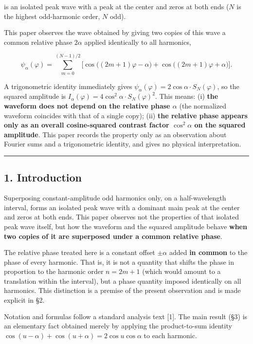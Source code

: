 \documentclass[
]{ltjsarticle}
\begin{document}
is an isolated peak wave with a peak at the center and zeros at both
ends (\(N\) is the highest odd-harmonic order, \(N\) odd).

This paper observes the wave obtained by giving two copies of this wave
a common relative phase \(2\alpha\) applied identically to all
harmonics,

\[
\psi_\alpha(\varphi)=\sum_{m=0}^{(N-1)/2}\Big[\cos\!\big((2m+1)\varphi-\alpha\big)+\cos\!\big((2m+1)\varphi+\alpha\big)\Big].
\]

A trigonometric identity immediately gives
\(\psi_\alpha(\varphi)=2\cos\alpha\cdot S_N(\varphi)\), so the squared
amplitude is \(I_\alpha(\varphi)=4\cos^2\!\alpha\cdot S_N(\varphi)^2\).
This means: (i) \textbf{the waveform does not depend on the relative
phase \(\alpha\)} (the normalized waveform coincides with that of a
single copy); (ii) \textbf{the relative phase appears only as an overall
cosine-squared contrast factor \(\cos^2\!\alpha\) on the squared
amplitude}. This paper records the property only as an observation about
Fourier sums and a trigonometric identity, and gives no physical
interpretation.

\begin{center}\rule{0.5\linewidth}{0.5pt}\end{center}

\subsection{1. Introduction}\label{introduction}

Superposing constant-amplitude odd harmonics only, on a half-wavelength
interval, forms an isolated peak wave with a dominant main peak at the
center and zeros at both ends. This paper observes not the properties of
that isolated peak wave itself, but how the waveform and the squared
amplitude behave \textbf{when two copies of it are superposed under a
common relative phase}.

The relative phase treated here is a constant offset \(\pm\alpha\) added
\textbf{in common} to the phase of every harmonic. That is, it is not a
quantity that shifts the phase in proportion to the harmonic order
\(n=2m+1\) (which would amount to a translation within the interval),
but a phase quantity imposed identically on all harmonics. This
distinction is a premise of the present observation and is made explicit
in §2.

Notation and formulas follow a standard analysis text {[}1{]}. The main
result (§3) is an elementary fact obtained merely by applying the
product-to-sum identity
\(\cos(u-\alpha)+\cos(u+\alpha)=2\cos u\cos\alpha\) to each harmonic.
\end{document}
